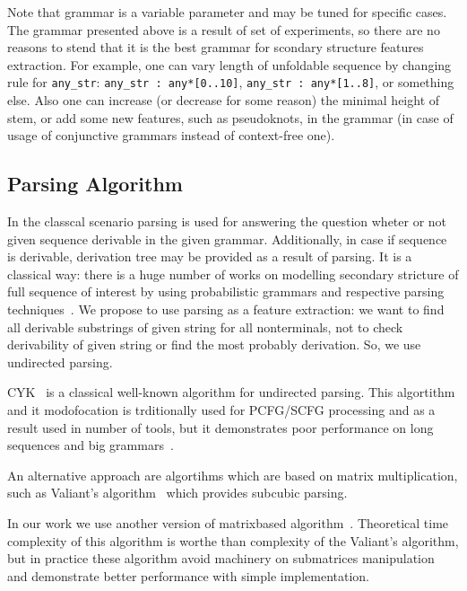 \documentclass[a4paper,twoside]{article}
\begin{document}
Note that grammar is a variable parameter and may be tuned for specific cases.
The grammar presented above is a result of set of experiments, so there are no reasons to stend that it is the best grammar for scondary structure features extraction.
For example, one can vary length of unfoldable sequence by changing rule for \verb|any_str|: \verb|any_str : any*[0..10]|, \verb|any_str : any*[1..8]|, or something else.
Also one can increase (or decrease for some reason) the minimal height of stem, or add some new features, such as pseudoknots, in the grammar (in case of usage of conjunctive grammars instead of context-free one).


\subsection{Parsing Algorithm}

\noindent In the classcal scenario parsing is used for answering the question wheter or not given sequence derivable in the given grammar.
Additionally, in case if sequence is derivable, derivation tree may be provided as a result of parsing. 
It is a classical way: there is a huge number of works on modelling secondary stricture of full sequence of interest by using probabilistic grammars and respective parsing techniques~\cite{knudsen2003pfold,Browny1993StochasticCG,Knudsen2005StochasticCG}.
We propose to use parsing as a feature extraction: we want to find all derivable substrings of given string for all nonterminals, not to check derivability of given string or find the most probably derivation.
So, we use undirected parsing.

CYK~\cite{Younger1967RecognitionAP} is a classical well-known algorithm for undirected parsing. 
This algortithm and it modofocation is trditionally used for PCFG/SCFG processing and as a result used in number of tools, but it demonstrates poor performance on long sequences and big grammars~\cite{Liu2005}.

An alternative approach are algortihms which are based on matrix multiplication, such as Valiant's algorithm~\cite{Valiant:1975:GCR:1739932.1740048} which provides subcubic parsing.

In our work we use another version of matrixbased algorithm~\cite{Azimov:2018:CPQ:3210259.3210264}.
Theoretical time complexity of this algorithm is worthe than complexity of the Valiant's algorithm, but in practice these algorithm avoid machinery on submatrices manipulation and demonstrate better performance with simple implementation.
\end{document}
